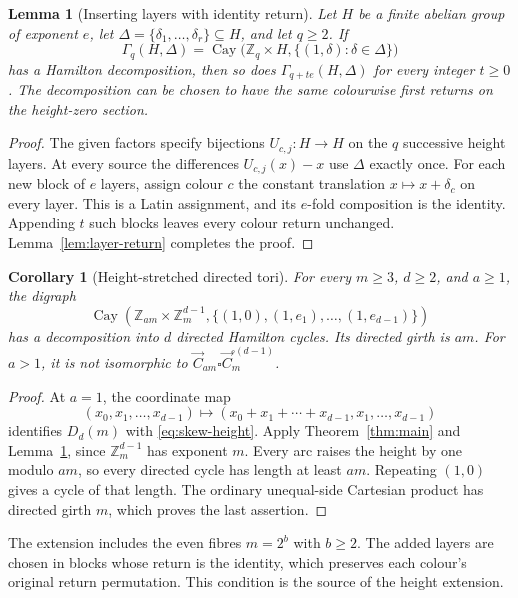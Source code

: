 \documentclass[11pt,reqno]{amsart}
\numberwithin{equation}{section}
\newtheorem{lemma}[theorem]{Lemma}
\newtheorem{corollary}[theorem]{Corollary}
\theoremstyle{definition}
\theoremstyle{remark}
\newcommand{\Z}{\mathbb Z}
\newcommand{\Cay}{\operatorname{Cay}}
\begin{document}
\begin{lemma}[Inserting layers with identity return]\label{lem:neutral-height}
Let $H$ be a finite abelian group of exponent $e$, let
$\Delta=\{\delta_1,\ldots,\delta_r\}\subseteq H$, and let $q\ge2$.
If
\[
 \Gamma_q(H,\Delta)=\Cay\bigl(\Z_q\times H,
                    \{(1,\delta):\delta\in\Delta\}\bigr)
\]
has a Hamilton decomposition, then so does $\Gamma_{q+te}(H,\Delta)$
for every integer $t\ge0$. The decomposition can be chosen to have the
same colourwise first returns on the height-zero section.
\end{lemma}
\begin{proof}
The given factors specify bijections $U_{c,j}:H\to H$ on the $q$
successive height layers. At every source the differences
$U_{c,j}(x)-x$ use $\Delta$ exactly once. For each new block of $e$
layers, assign colour $c$ the constant translation $x\mapsto x+\delta_c$
on every layer. This is a Latin assignment, and its $e$-fold composition
is the identity. Appending $t$ such blocks leaves every colour return
unchanged. Lemma~\ref{lem:layer-return} completes the proof.
\end{proof}

\begin{corollary}[Height-stretched directed tori]\label{cor:skew-height}
For every $m\ge3$, $d\ge2$, and $a\ge1$, the digraph
\begin{equation}\label{eq:skew-height}
 \Cay\left(\Z_{am}\times\Z_m^{d-1},
       \{(1,0),(1,e_1),\ldots,(1,e_{d-1})\}\right)
\end{equation}
has a decomposition into $d$ directed Hamilton cycles.
Its directed girth is $am$. For $a>1$, it is not isomorphic to
$\vec C_{am}\square\vec C_m^{\square(d-1)}$.
\end{corollary}
\begin{proof}
At $a=1$, the coordinate map
\[
 (x_0,x_1,\ldots,x_{d-1})\longmapsto
 (x_0+x_1+\cdots+x_{d-1},x_1,\ldots,x_{d-1})
\]
identifies $D_d(m)$ with \eqref{eq:skew-height}. Apply
Theorem~\ref{thm:main} and Lemma~\ref{lem:neutral-height}, since
$\Z_m^{d-1}$ has exponent $m$.
Every arc raises the height by one modulo $am$, so every directed cycle
has length at least $am$. Repeating $(1,0)$ gives a cycle of that length.
The ordinary unequal-side Cartesian product has directed girth $m$,
which proves the last assertion.
\end{proof}

The extension includes the even fibres $m=2^b$ with $b\ge2$.
The added layers are chosen in blocks whose return is the identity,
which preserves each colour's original return permutation. This
condition is the source of the height extension.
\end{document}
